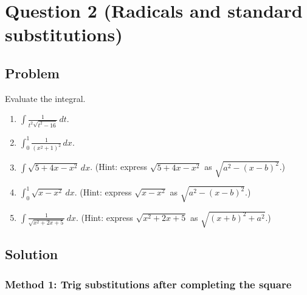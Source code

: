\documentclass[12pt]{article}
\begin{document}
\newpage


\section*{Question 2 (Radicals and standard substitutions)}

\subsection*{Problem}
Evaluate the integral.
\begin{enumerate}[label=(\alph*)]
\item \(\displaystyle \int \frac{1}{t^{2}\sqrt{t^{2}-16}}\,dt\).
\item \(\displaystyle \int_{0}^{1}\frac{1}{(x^{2}+1)^{2}}\,dx\).
\item \(\displaystyle \int \sqrt{5+4x-x^{2}}\,dx\). \quad (Hint: express \(\sqrt{5+4x-x^{2}}\) as \(\sqrt{a^{2}-(x-b)^{2}}\).)
\item \(\displaystyle \int_{0}^{1}\sqrt{x-x^{2}}\,dx\). \quad (Hint: express \(\sqrt{x-x^{2}}\) as \(\sqrt{a^{2}-(x-b)^{2}}\).)
\item \(\displaystyle \int \frac{1}{\sqrt{x^{2}+2x+5}}\,dx\). \quad (Hint: express \(\sqrt{x^{2}+2x+5}\) as \(\sqrt{(x+b)^{2}+a^{2}}\).)
\end{enumerate}

\subsection*{Solution}

\subsubsection*{Method 1: Trig substitutions after completing the square}
\end{document}
